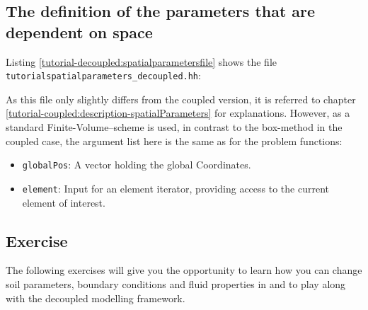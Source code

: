 \subsection{The definition of the parameters that are dependent on space}\label{tutorial-decoupled:description-spatialParameters}

Listing \ref{tutorial-decoupled:spatialparametersfile} shows the file
\verb+tutorialspatialparameters_decoupled.hh+:

\begin{lst}\label{tutorial-decoupled:spatialparametersfile} \mbox{}

\end{lst}
As this file only slightly differs from the coupled version, it is referred to 
chapter \ref{tutorial-coupled:description-spatialParameters} for explanations.
However, as a standard Finite-Volume--scheme is used, in contrast to the box-method
in the coupled case, the argument list here is the same as for the problem 
functions:
\begin{itemize}
 \item \texttt{globalPos}: A vector holding the global Coordinates.
 \item \texttt{element}: Input for an element iterator, providing access
	to the current element of interest.
\end{itemize}

\subsection{Exercise}
\label{tutorial-deoucpled:exercises}
The following exercises will give you the opportunity to learn how you can change 
soil parameters, boundary conditions and fluid properties in \Dumux and to play along 
with the decoupled modelling framework.

